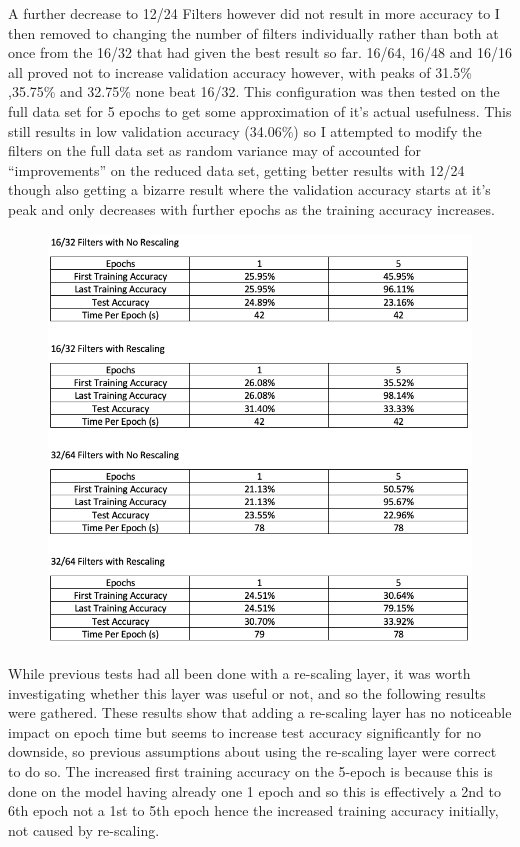 A further decrease to 12/24 Filters however did not result in more accuracy to I then removed to changing the number of filters individually rather than both at once from the 16/32 that had given the best result so far. 16/64, 16/48 and 16/16 all proved not to increase validation accuracy however, with peaks of 31.5\% ,35.75\% and 32.75\% none beat 16/32. This configuration was then tested on the full data set for 5 epochs to get some approximation of it’s actual usefulness. This still results in low validation accuracy (34.06\%) so I attempted to modify the filters on the full data set as random variance may of accounted for “improvements” on the reduced data set, getting better results with 12/24 though also getting a bizarre result where the validation accuracy starts at it’s peak and only decreases with further epochs as the training accuracy increases. \\

\begin{figure}[H]
\centering
\includegraphics[scale=0.6]{Media/Layers/1.png}
\end{figure}

While previous tests had all been done with a re-scaling layer, it was worth investigating whether this layer was useful or not, and so the following results were gathered. These results show that adding a re-scaling layer has no noticeable impact on epoch time but seems to increase test accuracy significantly for no downside, so previous assumptions about using the re-scaling layer were correct to do so. The increased first training accuracy on the 5-epoch is because this is done on the model having already one 1 epoch and so this is effectively a 2nd to 6th epoch not a 1st to 5th epoch hence the increased training accuracy initially, not caused by re-scaling. \\

